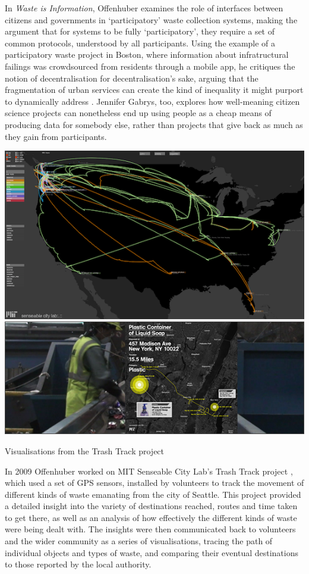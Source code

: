 \documentclass[nofonts,nols,justified,nobib]{tufte-book}
\begin{document}
In \emph{Waste is Information}, Offenhuber examines the role of interfaces between citizens and governments in `participatory' waste collection systems, making the argument that for systems to be fully `participatory', they require a set of common protocols, understood by all participants. Using the example of a participatory waste project in Boston, where information about infratructural failings was crowdsourced from residents through a mobile app, he critiques the notion of decentralisation for decentralisation's sake, arguing that the fragmentation of urban services can create the kind of inequality it might purport to dynamically address \cite{offenhuber_waste_2017}. Jennifer Gabrys, too, explores how well-meaning citizen science projects can nonetheless end up using people as a cheap means of producing data for somebody else, rather than projects that give back as much as they gain from participants. \cite{gabrys_programming_2014}

\begin{marginfigure}
\includegraphics[width=\textwidth]{img/1/trashtrack1.png}
\includegraphics[width=\textwidth]{img/1/trashtrack2.jpg}
\caption{Visualisations from the Trash Track project \cite{ratti_trash_2009}}
\end{marginfigure}

In 2009 Offenhuber worked on MIT Senseable City Lab's Trash Track project \cite{ratti_trash_2009}, which used a set of GPS sensors, installed by volunteers to track the movement of different kinds of waste emanating from the city of Seattle. This project provided a detailed insight into the variety of destinations reached, routes and time taken to get there, as well as an analysis of how effectively the different kinds of waste were being dealt with. The insights were then communicated back to volunteers and the wider community as a series of visualisations, tracing the path of individual objects and types of waste, and comparing their eventual destinations to those reported by the local authority.
\end{document}
